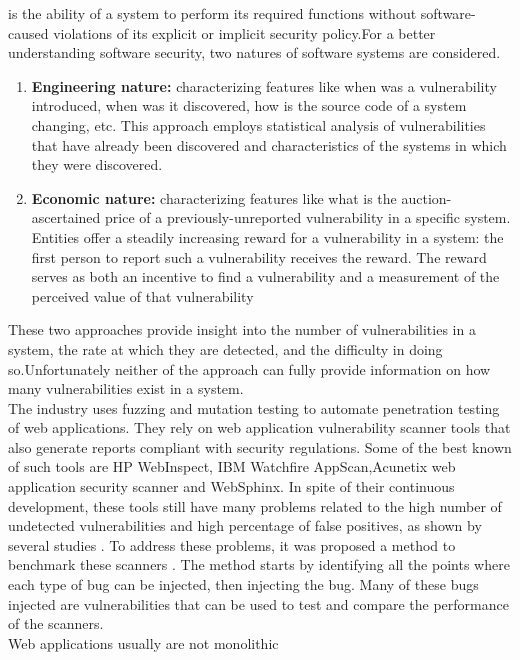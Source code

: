 is  the  ability  of  a  system  to  perform  its  required  functions
without software-caused violations of its explicit or implicit security policy.For a better understanding software security, two natures of software systems are considered.
\begin{enumerate}
	\item \textbf{Engineering nature: }characterizing features like when was a vulnerability introduced, when was it discovered, how is the
	source code of a system changing, etc. This approach employs statistical analysis of
	vulnerabilities that have already been discovered and characteristics of the systems
	in which they were discovered.
	\item \textbf{Economic nature: }characterizing features like what is the auction-ascertained price
	of a previously-unreported vulnerability in a specific system. Entities offer a steadily
	increasing reward for a vulnerability in a system: the first person to report such a
	vulnerability receives the reward. The reward serves as both an incentive to find a
	vulnerability and a measurement of the perceived value of that vulnerability
\end{enumerate} 
  These two approaches provide insight into the number of vulnerabilities in a
  system, the rate at which they are detected, and the difficulty in doing so.Unfortunately neither of the approach can fully provide information on how many vulnerabilities exist in a system.\\
  \newline  
The industry uses fuzzing and mutation testing to automate penetration testing of web applications. They rely on web application vulnerability scanner tools that also generate reports compliant with security regulations. Some of the best known of such tools are HP WebInspect, IBM Watchfire AppScan,Acunetix web application security scanner and WebSphinx. In spite of their continuous development, these tools still have many problems related to the high number
of undetected vulnerabilities and high percentage of false positives, as shown by several studies  \cite{8}. To address these problems, it was proposed a method to benchmark these scanners  \cite{8}. The method starts by identifying all the points where each type of bug can be injected, then injecting the bug. Many of these bugs injected are vulnerabilities that can be used to test and
compare the performance of the scanners.\\
\newline
Web applications usually are not monolithic
